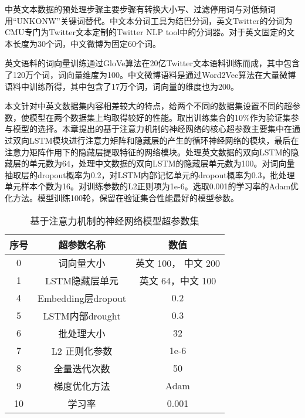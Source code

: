 中英文本数据的预处理步骤主要步骤有转换大小写、过滤停用词与对低频词用“UNKONW”关键词替代。中文本分词工具为结巴分词，英文Twitter的分词为CMU专门为Twitter文本定制的Twitter NLP tool中的分词器。对于英文固定的文本长度为30个词，中文微博为固定60个词。

英文语料的词向量训练通过GloVe算法在20亿Twitter文本语料训练而成，其中包含了120万个词，词向量维度为100。中文微博语料是通过Word2Vec算法在大量微博语料中训练所得，其中包含了17万个词，词向量的维度也为200。


本文针对中英文数据集内容相差较大的特点，给两个不同的数据集设置不同的超参数，使模型在两个数据集上均取得较好的性能。取出训练集合的10\%作为验证集参与模型的选择。本章提出的基于注意力机制的神经网络的核心超参数主要集中在通过双向LSTM模块进行注意力矩阵和隐藏层的产生的循环神经网络的模块，最后在注意力矩阵作用下的隐藏层提取特征的网络模块。处理英文数据的双向LSTM的隐藏层的单元数为64，处理中文数据的双向LSTM的隐藏层单元数为100。对词向量抽取层的dropout概率为0.2，对LSTM内部记忆单元的dropout概率为0.3，批处理单元样本个数为16。对训练参数的L2正则项为1e-6。选取0.001的学习率的Adam优化方法。模型训练100轮，保留在验证集合性能最好的模型参数。

\begin{table}[htbp]
	\caption[param]{基于注意力机制的神经网络模型超参数集}
	\label{param}
	\vspace{0.5em}\centering\wuhao
	\begin{tabular}{ccc}
		\toprule[1.5pt]
		序号& 超参数名称 &数值\\
		\midrule[1pt]
		0 &词向量大小& 英文 100， 中文 200\\
		1 &LSTM隐藏层单元& 英文 64，中文 100\\
		4 &Embedding层dropout& 0.2\\
		5 &LSTM内部drought& 0.3\\
		6 &批处理大小& 32\\
		7 &L2 正则化参数 &1e-6\\
		8 &全量迭代次数& 50\\
		9 &梯度优化方法& Adam\\
		10 &学习率& 0.001\\
		\bottomrule[1.5pt]
	\end{tabular}
\end{table}

